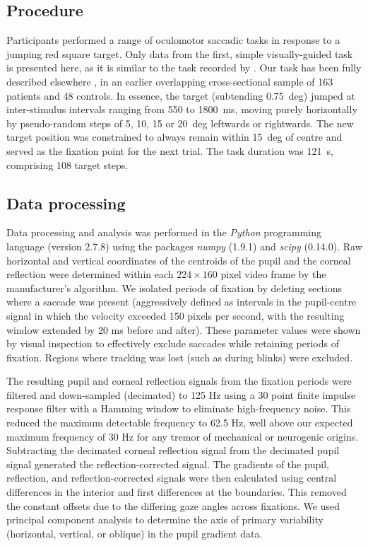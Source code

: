 \documentclass[jou,a4paper]{apa6}
\begin{document}
\subsection{Procedure}
Participants performed a range of oculomotor saccadic tasks in response to a jumping red square target. Only data from the first, simple visually-guided task is presented here, as it is similar to the task recorded by \cite{Gitchel2012Pervasive-ocula}. Our task has been fully described elsewhere \citep{MacAskill2012The-influence-o}, in an earlier overlapping cross-sectional sample of 163 patients and 48 controls.
In essence, the target (subtending 0.75~deg) jumped at inter-stimulus intervals ranging from 550 to 1800~ms, moving purely horizontally by pseudo-random steps of 5, 10, 15 or 20~deg leftwards or rightwards. The new target position was constrained to always remain within 15~deg of centre and served as the fixation point for the next trial. The task duration was 121~s, comprising 108 target steps.

\subsection{Data processing}
Data processing and analysis was performed in the \textit{Python} programming language (version 2.7.8) using the packages \textit{numpy} (1.9.1) and \textit{scipy} (0.14.0). Raw horizontal and vertical coordinates of the centroids of the pupil and the corneal reflection were determined within each $224 \times 160$ pixel video frame by the manufacturer's algorithm. We isolated periods of fixation by deleting sections where a saccade was present (aggressively defined as intervals in the pupil-centre signal in which the velocity exceeded 150 pixels per second, with the resulting window extended by 20 ms before and after). These parameter values were shown by visual inspection to effectively exclude saccades while retaining periods of fixation. Regions where tracking was lost (such as during blinks) were excluded.

The resulting pupil and corneal reflection signals from the fixation periods were filtered and down-sampled (decimated) to 125 Hz using a 30 point finite impulse response filter with a Hamming window to eliminate high-frequency noise. This reduced the maximum detectable frequency to 62.5 Hz, well above our expected maximum frequency of 30 Hz for any tremor of mechanical or neurogenic origins. Subtracting the decimated corneal reflection signal from the decimated pupil signal generated the reflection-corrected signal. The gradients of the pupil, reflection, and reflection-corrected signals were then calculated using central differences in the interior and first differences at the boundaries. This removed the constant offsets due to the differing gaze angles across fixations. We used principal component analysis to determine the axis of primary variability (horizontal, vertical, or oblique) in the pupil gradient data.
\end{document}
